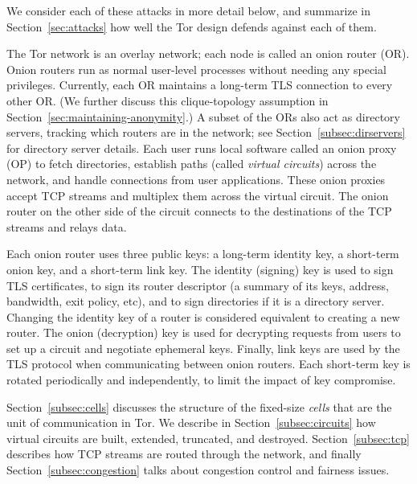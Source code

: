 \documentclass[times,10pt,twocolumn]{article}
\begin{document}
We consider each of these attacks in more detail below, and summarize
in Section~\ref{sec:attacks} how well the Tor design defends against
each of them.


\label{sec:design}

The Tor network is an overlay network; each node is called an onion router
(OR). Onion routers run as normal user-level processes without needing
any special
privileges.  Currently, each OR maintains a long-term TLS \cite{TLS}
connection to every other
OR.  (We further discuss this clique-topology assumption in
Section~\ref{sec:maintaining-anonymity}.) A subset of the ORs also act as
directory servers, tracking which routers are in the network;
see Section~\ref{subsec:dirservers} for directory server details.
Each user
runs local software called an onion proxy (OP) to fetch directories,
establish paths (called \emph{virtual circuits}) across the network,
and handle connections from user applications.  These onion proxies accept
TCP streams and multiplex them across the virtual circuit. The onion
router on the other side 
of the circuit connects to the destinations of
the TCP streams and relays data.

Each onion router uses three public keys: a long-term identity key, a
short-term onion key, and a short-term link key.  The identity
(signing) key is used to sign TLS certificates, to sign its router
descriptor (a summary of its keys, address, bandwidth, exit policy,
etc), and to sign directories if it is a directory server. Changing
the identity key of a router is considered equivalent to creating a
new router. The onion (decryption) key is used for decrypting requests
from users to set up a circuit and negotiate ephemeral keys. Finally,
link keys are used by the TLS protocol when communicating between
onion routers. Each short-term key is rotated periodically and
independently, to limit the impact of key compromise.

Section~\ref{subsec:cells} discusses the structure of the fixed-size
\emph{cells} that are the unit of communication in Tor. We describe
in Section~\ref{subsec:circuits} how virtual circuits are
built, extended, truncated, and destroyed. Section~\ref{subsec:tcp}
describes how TCP streams are routed through the network, and finally
Section~\ref{subsec:congestion} talks about congestion control and
fairness issues.
\end{document}
